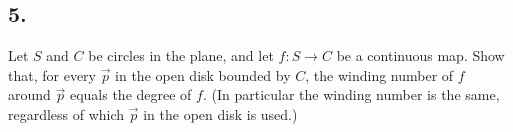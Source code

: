 \documentclass{amsart}
\theoremstyle{plain}
\theoremstyle{definition}
\theoremstyle{remark}
\begin{document}
\vspace{.15in}
\noindent
\subsection*{5.} Let $S$ and $C$ be circles in the plane, and let $f : S\to C$ be a continuous map. Show that, for every $\vec{p}$ in the open disk bounded by $C$, the winding number of $f$ around $\vec{p}$ equals the degree of $f$. (In particular the winding number is the same, regardless of which $\vec{p}$ in the open disk is used.) 
 
\end{document}
